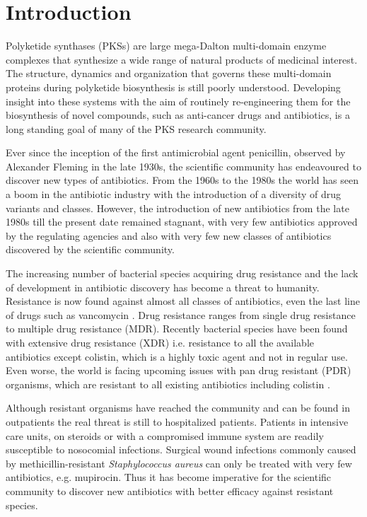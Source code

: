 \chapter{Introduction}
\label{cha:Introduction}
Polyketide synthases (PKSs) are large mega-Dalton multi-domain enzyme complexes that synthesize a wide range of natural products of medicinal interest. The structure, dynamics and organization that governs these multi-domain proteins during polyketide biosynthesis is still poorly understood. Developing insight into these systems with the aim of routinely re-engineering them for the biosynthesis of novel compounds, such as anti-cancer drugs and antibiotics, is a long standing goal of many of the PKS research community.

Ever since the inception of the first antimicrobial agent penicillin, observed by Alexander Fleming in the late 1930s, the scientific community has endeavoured to discover new types of antibiotics. From the 1960s to the 1980s the world has seen a boom in the antibiotic industry with the introduction of a diversity of drug variants and classes. However, the introduction of new antibiotics from  the late 1980s till the present date remained stagnant, with very few antibiotics approved by the regulating agencies and also with very few new classes of antibiotics discovered by the scientific community. 

The increasing number of bacterial species acquiring drug resistance and the lack of development in antibiotic discovery has become a threat to humanity. Resistance is now found against almost all classes of antibiotics, even the last line of drugs such as vancomycin \parencite{Alanis2005a, Saga2009}. Drug resistance ranges from single drug resistance to multiple drug resistance (MDR). Recently bacterial species have been found with extensive drug resistance (XDR)  i.e. resistance to all the available antibiotics except colistin, which is a highly toxic agent and not in regular use. Even worse, the world is facing upcoming issues with pan drug resistant (PDR)  organisms, which are resistant to all existing antibiotics including colistin \parencite{Powers2004, Conly2005, Alanis2005a, Saga2009}. 

Although resistant organisms have reached the community and can be found in outpatients the real threat is still to hospitalized patients. Patients in intensive care units, on steroids or with a compromised immune system are readily susceptible to nosocomial infections. Surgical wound infections commonly caused by methicillin-resistant \textit{Staphylococcus aureus} can only be treated with very few antibiotics, e.g. mupirocin. Thus it has become imperative for the scientific community to discover new antibiotics with better efficacy against resistant species. 

